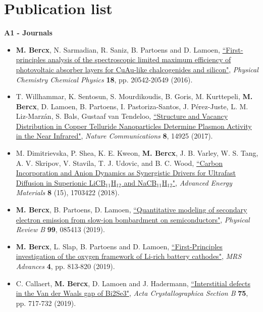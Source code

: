 \chapter*{Publication list} \label{chapter:publications}

\textbf{A1 - Journals}
\begin{itemize}
\item \textbf{M. Bercx}, N. Sarmadian, R. Saniz, B. Partoens and D. Lamoen, \href{https://www.doi.org/10.1039/C6CP03468C}{``First-principles analysis of the spectroscopic limited maximum efficiency of photovoltaic absorber layers for CuAu-like chalcogenides and silicon"}, \emph{Physical Chemistry Chemical  Physics} \textbf{18}, pp. 20542-20549 (2016).

\item T. Willhammar, K. Sentosun, S. Mourdikoudis, B. Goris, M. Kurttepeli, \textbf{M. Bercx}, D. Lamoen, B. Partoens, I. Pastoriza-Santos, J. P\'erez-Juste, L. M. Liz-Marz\'an, S. Bals, Gustaaf van Tendeloo, \href{https://doi.org/10.1038/ncomms14925}{``Structure and Vacancy Distribution in Copper Telluride Nanoparticles Determine Plasmon Activity in the Near Infrared"}, \emph{Nature Communications} \textbf{8}, 14925 (2017).

\item M. Dimitrievska, P. Shea, K. E. Kweon, \textbf{M. Bercx}, J. B. Varley, W. S. Tang, A. V. Skripov, V. Stavila, T. J. Udovic, and B. C. Wood, \href{https://doi.org/10.1002/aenm.201703422}{``Carbon Incorporation and Anion Dynamics as Synergistic Drivers for Ultrafast Diffusion in Superionic LiCB$_{11}$H$_{12}$ and NaCB$_{11}$H$_{12}$"}, \textit{Advanced Energy Materials} \textbf{8} (15), 1703422 (2018).

\item \textbf{M. Bercx}, B. Partoens, D. Lamoen, \href{https://doi.org/10.1103/PhysRevB.99.085413}{``Quantitative modeling of secondary electron emission from slow-ion bombardment on semiconductors"}, \textit{Physical Review B} \textbf{99}, 085413 (2019).

\item \textbf{M. Bercx}, L. Slap, B. Partoens and D. Lamoen, \href{https://doi.org/10.1557/adv.2019.135}{``First-Principles investigation of the oxygen framework of Li-rich battery cathodes"}, \textit{MRS Advances} \textbf{4}, pp. 813-820 (2019).

\item C. Callaert, \textbf{M. Bercx},  D. Lamoen and J. Hadermann, \href{https://doi.org/10.1107/S2052520619008357}{``Interstitial defects in the Van der Waals gap of Bi2Se3"}, \textit{Acta Crystallographica Section B} \textbf{75}, pp. 717-732 (2019).


\end{itemize}

